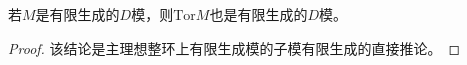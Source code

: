 \documentclass[../../main.tex]{subfiles}%
\begin{document}
\begin{corollary}
若$M$是有限生成的$D$模，则$\mathrm{Tor}M$也是有限生成的$D$模。
\end{corollary}
\begin{proof}

该结论是主理想整环上有限生成模的子模有限生成的直接推论。

\end{proof}
\end{document}
